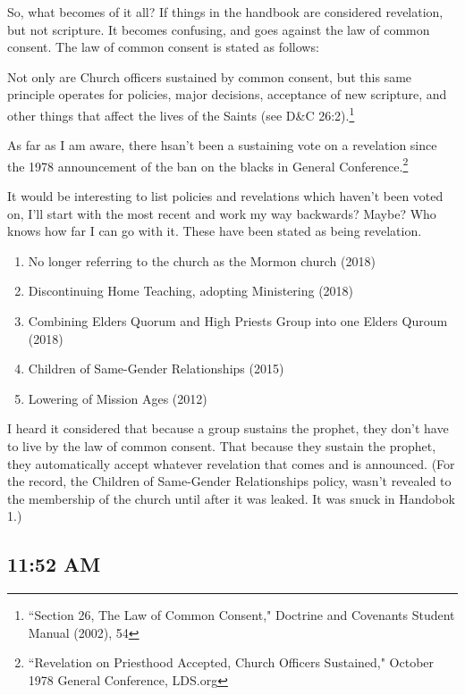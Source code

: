So, what becomes of it all? If things in the handbook are considered revelation, but
not scripture. It becomes confusing, and goes against the law of common consent. The
law of common consent is stated as follows:

\begin{displayquote}
Not only are Church officers sustained by common consent, but this same principle 
operates for policies, major decisions, acceptance of new scripture, and other things 
that affect the lives of the Saints (see D\&C 26:2).\footnote{``Section 26, The Law 
of Common Consent," Doctrine and Covenants Student Manual (2002), 54}
\end{displayquote}

As far as I am aware, there hsan't been a sustaining vote on a revelation since the
1978 announcement of the ban on the blacks in General Conference.\footnote{
``Revelation on Priesthood Accepted, Church Officers Sustained," October 1978 General
Conference, LDS.org
}

It would be interesting to list policies and revelations which haven't been voted on,
I'll start with the most recent and work my way backwards? Maybe? Who knows how far I
can go with it. These have been stated as being revelation.

\begin{enumerate}
\item No longer referring to the church as the Mormon church (2018)
\item Discontinuing Home Teaching, adopting Ministering (2018)
\item Combining Elders Quorum and High Priests Group into one Elders Quroum (2018)
\item Children of Same-Gender Relationships (2015)
\item Lowering of Mission Ages (2012)
\end{enumerate}

I heard it considered that because a group sustains the prophet, they don't have to
live by the law of common consent. That because they sustain the prophet, they
automatically accept whatever revelation that comes and is announced. (For the
  record, the Children of Same-Gender Relationships policy, wasn't revealed to
  the membership of the church until after it was leaked. It was snuck in Handobok
  1.)

\subsection{11:52 AM}

